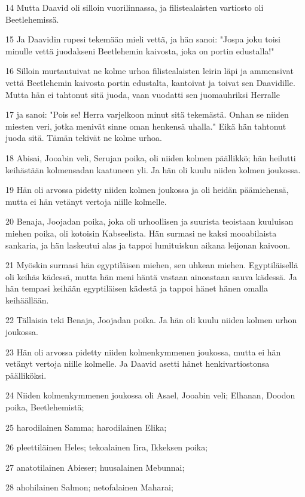 \par 14 Mutta Daavid oli silloin vuorilinnassa, ja filistealaisten vartiosto oli Beetlehemissä.
\par 15 Ja Daavidin rupesi tekemään mieli vettä, ja hän sanoi: "Jospa joku toisi minulle vettä juodakseni Beetlehemin kaivosta, joka on portin edustalla!"
\par 16 Silloin murtautuivat ne kolme urhoa filistealaisten leirin läpi ja ammensivat vettä Beetlehemin kaivosta portin edustalta, kantoivat ja toivat sen Daavidille. Mutta hän ei tahtonut sitä juoda, vaan vuodatti sen juomauhriksi Herralle
\par 17 ja sanoi: "Pois se! Herra varjelkoon minut sitä tekemästä. Onhan se niiden miesten veri, jotka menivät sinne oman henkensä uhalla." Eikä hän tahtonut juoda sitä. Tämän tekivät ne kolme urhoa.
\par 18 Abisai, Jooabin veli, Serujan poika, oli niiden kolmen päällikkö; hän heilutti keihästään kolmensadan kaatuneen yli. Ja hän oli kuulu niiden kolmen joukossa.
\par 19 Hän oli arvossa pidetty niiden kolmen joukossa ja oli heidän päämiehensä, mutta ei hän vetänyt vertoja niille kolmelle.
\par 20 Benaja, Joojadan poika, joka oli urhoollisen ja suurista teoistaan kuuluisan miehen poika, oli kotoisin Kabseelista. Hän surmasi ne kaksi mooabilaista sankaria, ja hän laskeutui alas ja tappoi lumituiskun aikana leijonan kaivoon.
\par 21 Myöskin surmasi hän egyptiläisen miehen, sen uhkean miehen. Egyptiläisellä oli keihäs kädessä, mutta hän meni häntä vastaan ainoastaan sauva kädessä. Ja hän tempasi keihään egyptiläisen kädestä ja tappoi hänet hänen omalla keihäällään.
\par 22 Tällaisia teki Benaja, Joojadan poika. Ja hän oli kuulu niiden kolmen urhon joukossa.
\par 23 Hän oli arvossa pidetty niiden kolmenkymmenen joukossa, mutta ei hän vetänyt vertoja niille kolmelle. Ja Daavid asetti hänet henkivartiostonsa päälliköksi.
\par 24 Niiden kolmenkymmenen joukossa oli Asael, Jooabin veli; Elhanan, Doodon poika, Beetlehemistä;
\par 25 harodilainen Samma; harodilainen Elika;
\par 26 pleettiläinen Heles; tekoalainen Iira, Ikkeksen poika;
\par 27 anatotilainen Abieser; huusalainen Mebunnai;
\par 28 ahohilainen Salmon; netofalainen Maharai;
